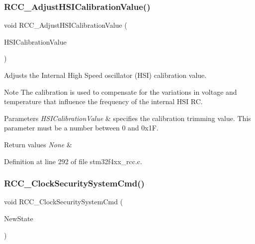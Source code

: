 \subsubsection{\texorpdfstring{R\+C\+C\+\_\+\+Adjust\+H\+S\+I\+Calibration\+Value()}{RCC\_AdjustHSICalibrationValue()}}
{\footnotesize\ttfamily void R\+C\+C\+\_\+\+Adjust\+H\+S\+I\+Calibration\+Value (\begin{DoxyParamCaption}\item[{uint8\+\_\+t}]{H\+S\+I\+Calibration\+Value }\end{DoxyParamCaption})}



Adjusts the Internal High Speed oscillator (H\+SI) calibration value. 

\begin{DoxyNote}{Note}
The calibration is used to compensate for the variations in voltage and temperature that influence the frequency of the internal H\+SI RC. 
\end{DoxyNote}

\begin{DoxyParams}{Parameters}
{\em H\+S\+I\+Calibration\+Value} & specifies the calibration trimming value. This parameter must be a number between 0 and 0x1F. \\
\hline
\end{DoxyParams}

\begin{DoxyRetVals}{Return values}
{\em None} & \\
\hline
\end{DoxyRetVals}


Definition at line 292 of file stm32f4xx\+\_\+rcc.\+c.

\mbox{\label{group___r_c_c___group1_ga0ff1fd7b9a8a49cdda11b7d7261c3494}} 
\subsubsection{\texorpdfstring{R\+C\+C\+\_\+\+Clock\+Security\+System\+Cmd()}{RCC\_ClockSecuritySystemCmd()}}
{\footnotesize\ttfamily void R\+C\+C\+\_\+\+Clock\+Security\+System\+Cmd (\begin{DoxyParamCaption}\item[{Functional\+State}]{New\+State }\end{DoxyParamCaption})}



